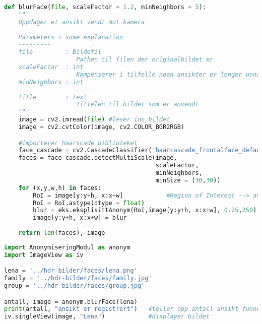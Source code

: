 \begin{lstlisting}[language=Python]
def blurFace(file, scaleFactor = 1.2, minNeighbors = 5):
    """
    Oppdager et ansikt vendt mot kamera
   
    Parameters + some explanation
    ---------
    file         : Bildefil
                    Pathen til filen der originalbildet er
    scaleFactor  : int
                    Kompenserer i tilfelle noen ansikter er lenger unna enn andre
    minNeighbors : int
                    ----
    title        : text
                    Tittelen til bildet som er anvendt
    """
    image = cv2.imread(file) #leser inn bildet
    image = cv2.cvtColor(image, cv2.COLOR_BGR2RGB)

    #importerer haarscade biblioteket
    face_cascade = cv2.CascadeClassifier('haarcascade_frontalface_default.xml')  
    faces = face_cascade.detectMultiScale(image,
                                          scaleFactor,
                                          minNeighbors,
                                          minSize = (30,30))
    for (x,y,w,h) in faces:
        RoI = image[y:y+h, x:x+w]            #Region of Interest --> ansiktet
        RoI = RoI.astype(dtype = float)
        blur = eks.eksplisittAnonym(RoI,image[y:y+h, x:x+w], 0.25,250)               
        image[y:y+h, x:x+w] = blur
        
    return len(faces), image
    \end{lstlisting}

\begin{lstlisting}[language=Python]  
import AnonymiseringModul as anonym
import ImageView as iv

lena = '../hdr-bilder/faces/lena.png'
family = '../hdr-bilder/faces/family.jpg'
group = '../hdr-bilder/faces/group.jpg'

antall, image = anonym.blurFace(lena)
print(antall, "ansikt er registrert")   #teller opp antall ansikt funnet
iv.singleView(image, "Lena")            #displayer bildet
\end{lstlisting}


    